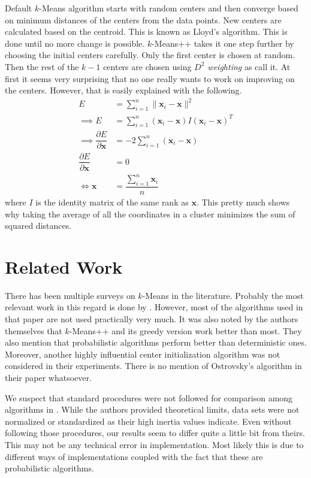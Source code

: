\documentclass[twoside, 11pt]{article}
\newcommand{\x}{\mathbf{x}}
\begin{document}
	Default $k$-Means algorithm starts with random centers and then converge based on minimum distances of the centers from the data points. New centers are calculated based on the centroid. This is known as Lloyd's algorithm\cite{lloyd}. This is done until no more change is possible. $k$-Means++ takes it one step further by choosing the initial centers carefully. Only the first center is chosen at random. Then the rest of the $k-1$ centers are chosen using \textit{$D^2$ weighting} as \cite{kmeans++} call it. At first it seems very surprising that no one really wants to work on improving on the centers. However, that is easily explained with the following.
		\begin{align*}
			E & = \sum_{i=1}^n\|\x_i-\x\|^2\\
			\implies E & = \sum_{i=1}^n(\x_i-\x)I(\x_i-\x)^{T}\\
			\implies \dfrac{\partial{E}}{\partial{\x}} & = -2\sum_{i=1}^n(\x_i-\x)\\
			\dfrac{\partial{E}}{\partial{\x}} & = 0\\
			\iff \x & = \dfrac{\sum_{i=1}^n\x_i}{n}
		\end{align*}
	where $I$ is the identity matrix of the same rank as $\x$. This pretty much shows why taking the average of all the coordinates in a cluster minimizes the sum of squared distances.
	\section{Related Work}
	There has been multiple surveys on $k$-Means in the literature. Probably the most relevant work in this regard is done by \cite{celebi}. However, most of the algorithms used in that paper are not used practically very much. It was also noted by the authors themselves that $k$-Means++ and its greedy version work better than most. They also mention that probabilistic algorithms perform better than deterministic ones. Moreover, another highly influential center initialization algorithm \cite{ostrovsky} was not considered in their experiments. There is no mention of Ostrovsky's algorithm in their paper whatsoever.
	
	We suspect that standard procedures were not followed for comparison among algorithms in \cite{kmeans++}. While the authors provided theoretical limits, data sets were not normalized or standardized as their high inertia values indicate. Even without following those procedures, our results seem to differ quite a little bit from theirs. This may not be any technical error in implementation. Most likely this is due to different ways of implementations coupled with the fact that these are probabilistic algorithms.
	
\end{document}
